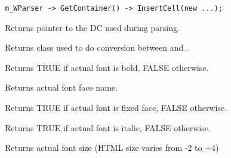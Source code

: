 \begin{verbatim}
m_WParser -> GetContainer() -> InsertCell(new ...);
\end{verbatim}

\label{wxhtmlwinparsergetdc}


Returns pointer to the DC used during parsing.


\label{wxhtmlwinparsergetencodingconverter}


Returns  class used
to do conversion between 
and .

\label{wxhtmlwinparsergetfontbold}


Returns TRUE if actual font is bold, FALSE otherwise.

\label{wxhtmlwinparsergetfontface}


Returns actual font face name.


\label{wxhtmlwinparsergetfontfixed}


Returns TRUE if actual font is fixed face, FALSE otherwise.

\label{wxhtmlwinparsergetfontitalic}


Returns TRUE if actual font is italic, FALSE otherwise.


\label{wxhtmlwinparsergetfontsize}


Returns actual font size (HTML size varies from -2 to +4)

\label{wxhtmlwinparsergetfontunderlined}


